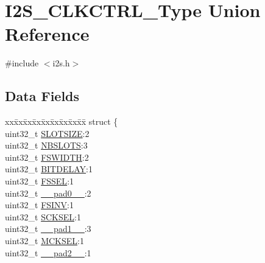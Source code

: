 \hypertarget{union_i2_s___c_l_k_c_t_r_l___type}{}\section{I2\+S\+\_\+\+C\+L\+K\+C\+T\+R\+L\+\_\+\+Type Union Reference}
\label{union_i2_s___c_l_k_c_t_r_l___type}


{\ttfamily \#include $<$i2s.\+h$>$}

\subsection*{Data Fields}
\begin{DoxyCompactItemize}
\item 
\begin{tabbing}
xx\=xx\=xx\=xx\=xx\=xx\=xx\=xx\=xx\=\kill
struct \{\\
\>uint32\_t \mbox{\hyperlink{union_i2_s___c_l_k_c_t_r_l___type_adb480f7ea911de6edf97e220e66145fe}{SLOTSIZE}}:2\\
\>uint32\_t \mbox{\hyperlink{union_i2_s___c_l_k_c_t_r_l___type_aef52e8f308ddb8c4001604292a9ccca2}{NBSLOTS}}:3\\
\>uint32\_t \mbox{\hyperlink{union_i2_s___c_l_k_c_t_r_l___type_a1bbd7ca3c55a103ac08373f4178f422d}{FSWIDTH}}:2\\
\>uint32\_t \mbox{\hyperlink{union_i2_s___c_l_k_c_t_r_l___type_ad4b2897cd95d1c1bfc911bbd9e654f7b}{BITDELAY}}:1\\
\>uint32\_t \mbox{\hyperlink{union_i2_s___c_l_k_c_t_r_l___type_a45acfa85a18882921c2ae41988fc31e3}{FSSEL}}:1\\
\>uint32\_t \mbox{\hyperlink{union_i2_s___c_l_k_c_t_r_l___type_a3e57c2ef1c3ffb36722f000cc1156824}{\_\_pad0\_\_}}:2\\
\>uint32\_t \mbox{\hyperlink{union_i2_s___c_l_k_c_t_r_l___type_a5cdd108d14667a1ff88d6a395b53b247}{FSINV}}:1\\
\>uint32\_t \mbox{\hyperlink{union_i2_s___c_l_k_c_t_r_l___type_a7f1984221593a52eac95842409da0822}{SCKSEL}}:1\\
\>uint32\_t \mbox{\hyperlink{union_i2_s___c_l_k_c_t_r_l___type_a6712ba6dd1d5b43d2d56ff8ac4e275a7}{\_\_pad1\_\_}}:3\\
\>uint32\_t \mbox{\hyperlink{union_i2_s___c_l_k_c_t_r_l___type_a5b7f1180a95a94d98b024c55bccdb022}{MCKSEL}}:1\\
\>uint32\_t \mbox{\hyperlink{union_i2_s___c_l_k_c_t_r_l___type_a9ce12a63de64ef64ae2d59d128251cae}{\_\_pad2\_\_}}:1\\

\end{tabbing}
\end{DoxyCompactItemize}
